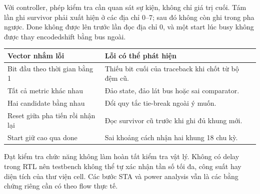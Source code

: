 \documentclass[12pt,a4paper]{article}
\renewcommand{\_}{\originalunderscore\allowbreak}
\begin{document}
Với controller, phép kiểm tra cần quan sát sự kiện, không chỉ giá trị cuối. Tám lần ghi survivor phải xuất hiện ở các địa chỉ 0--7; sau đó không còn ghi trong pha ngược. Done không được lên trước lần đọc địa chỉ 0, và một start lúc busy không được thay encoded\_shift bằng bus ngoài.

\begin{table}[H]\centering\small
\begin{tabularx}{\textwidth}{@{}P{4cm}Y@{}}\toprule
\textbf{Vector nhắm lỗi}&\textbf{Lỗi có thể phát hiện}\\\midrule
Bit đầu theo thời gian bằng 1&Thiếu bit cuối của traceback khi chốt từ bộ đệm cũ.\\
Tất cả metric khác nhau&Đảo state, đảo lát bus hoặc sai comparator.\\
Hai candidate bằng nhau&Đổi quy tắc tie-break ngoài ý muốn.\\
Reset giữa pha tiến rồi nhận lại&Đọc survivor cũ trước khi ghi đủ khung mới.\\
Start giữ cao qua done&Sai khoảng cách nhận hai khung 18 chu kỳ.\\\bottomrule
\end{tabularx}
\end{table}
Đạt kiểm tra chức năng không làm hoàn tất kiểm tra vật lý. Không có delay trong RTL nên testbench không thể tự xác nhận tần số tối đa, công suất hay diện tích của thư viện cell. Các bước STA và power analysis vẫn là các bằng chứng riêng cần có theo flow thực tế.
\end{document}

